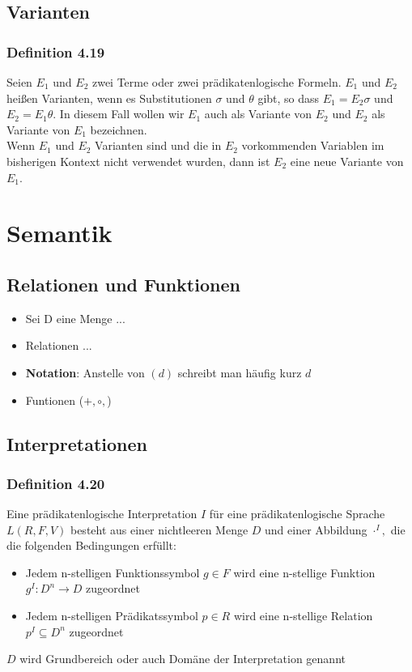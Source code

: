 \subsection{Varianten}
\subsubsection{Definition 4.19}
Seien \(E_{1} \) und \(E_{2} \) zwei Terme oder zwei prädikatenlogische Formeln. \(E_{1}\) und \(E_{2}\) heißen Varianten, wenn es Substitutionen \(\sigma \) und \(\theta \) gibt, so dass \(E_{1} = E_{2}\sigma \) und \(E_{2} = E_{1}\theta \). In diesem Fall wollen wir \(E_{1}\) auch als Variante von \(E_{2}\) und \(E_{2}\) als Variante von \(E_{1}\) bezeichnen. \\
Wenn \(E_{1}\) und \(E_{2}\) Varianten sind und die in \(E_{2}\) vorkommenden Variablen im bisherigen Kontext nicht verwendet wurden, dann ist \(E_{2}\) eine neue Variante von \(E_{1}\).

\section{Semantik}
\subsection{Relationen und Funktionen}
\begin{itemize}
	\item Sei D eine Menge ...
	\item Relationen ... 
	\item \textbf{Notation}: Anstelle von \((d)\) schreibt man häufig kurz \(d\)
	\item Funtionen (\(+,\circ,\))
\end{itemize}
\subsection{Interpretationen}
\subsubsection{Definition 4.20}
Eine prädikatenlogische Interpretation \(I\) für eine prädikatenlogische Sprache \(L(R,F,V)\) besteht aus einer nichtleeren Menge \(D\) und einer Abbildung \(\cdot ^I, \) die die folgenden Bedingungen erfüllt:
\begin{itemize}
	\item Jedem n-stelligen Funktionssymbol \(g\in F\) wird eine n-stellige Funktion \(g^I:D^n\to D\) zugeordnet
	\item Jedem n-stelligen Prädikatssymbol \(p\in R\) wird eine n-stellige Relation \(p^I \subseteq D^n\) zugeordnet
\end{itemize}
\(D\) wird Grundbereich oder auch Domäne der Interpretation genannt
